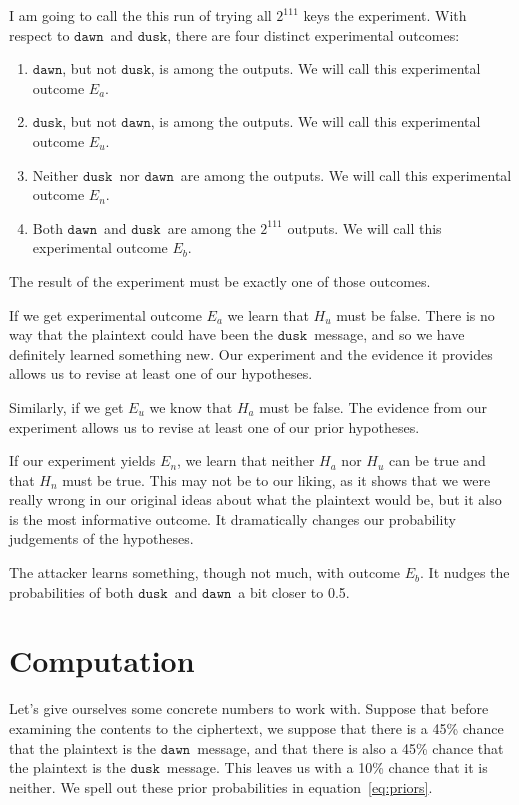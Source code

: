 \documentclass[11pt]{article}
\newcommand\mdusk{\ensuremath{\mathtt{dusk}}}
\newcommand\mdawn{\ensuremath{\mathtt{dawn}}}
\begin{document}
I am going to call the this run of trying all $2^{111}$ keys the experiment. 
With respect to \mdawn\ and \mdusk, there are four distinct experimental outcomes:

\begin{enumerate}
    \item\label{en:dawn} \mdawn, but not \mdusk, is among the outputs.
        We will call this experimental outcome $E_a$.
    \item\label{en:dusk} \mdusk, but not \mdawn, is among the outputs.
        We will call this experimental outcome $E_u$.
    \item\label{en:neither} Neither \mdusk\ nor \mdawn\ are among the outputs.
    We will call this experimental outcome $E_n$.
    \item\label{en:both} Both \mdawn\ and \mdusk\ are among the $2^{111}$ outputs.
    We will call this experimental outcome $E_b$.
\end{enumerate}
The result of the experiment must be exactly one of those outcomes.

If we get experimental outcome $E_a$
we learn that $H_u$ must be false.
There is no way that the plaintext could have been the \mdusk\ message,
and so we have definitely learned something new.
Our experiment and the evidence it provides allows us to revise at least one of our hypotheses.

Similarly, if we get $E_u$ we know that $H_a$ must be false.
The evidence from our experiment allows us to revise at least one of our prior hypotheses.

If our experiment yields $E_n$,
we learn that neither $H_a$ nor $H_u$ can be true and that $H_n$ must be true.
This may not be to our liking, as it shows that we were really wrong in our
original ideas about what the plaintext would be, but it also is the most informative outcome. It dramatically changes our probability judgements of the hypotheses.

The attacker learns something, though not much, with outcome $E_b$.
It nudges the probabilities of both \mdusk\ and \mdawn\ a bit closer to 0.5.

\section{Computation}

Let's give ourselves some concrete numbers to work with.
Suppose that before examining the contents to the ciphertext, we 
suppose that there is a 45\% chance that the plaintext is the \mdawn\ message,
and that there is also a 45\% chance that the plaintext is the \mdusk\ message.
This leaves us with a 10\% chance that it is neither.
We spell out these prior probabilities in equation~\ref{eq:priors}.
\end{document}
